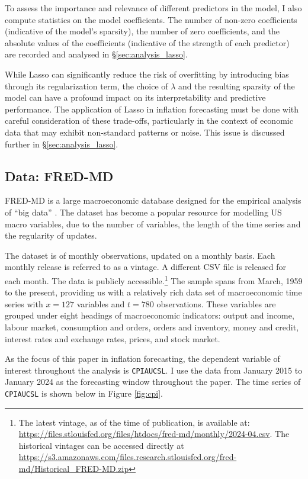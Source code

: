 To assess the importance and relevance of different predictors in the model, I also compute statistics on the model coefficients. The number of non-zero coefficients (indicative of the model's sparsity), the number of zero coefficients, and the absolute values of the coefficients (indicative of the strength of each predictor) are recorded and analysed in \S \ref{sec:analysis_lasso}.

While Lasso can significantly reduce the risk of overfitting by introducing bias through its regularization term, the choice of $\lambda$ and the resulting sparsity of the model can have a profound impact on its interpretability and predictive performance. The application of Lasso in inflation forecasting must be done with careful consideration of these trade-offs, particularly in the context of economic data that may exhibit non-standard patterns or noise. This issue is discussed further in \S \ref{sec:analysis_lasso}.



\subsection{Data: FRED-MD} \label{sec:methods_data}

FRED-MD is a large macroeconomic database designed for the empirical analysis of “big data” \autocite{McCracken2016FRED-MD:Research}. The dataset has become a popular resource for modelling US macro variables, due to the number of variables, the length of the time series and the regularity of updates.

The dataset is of monthly observations, updated on a monthly basis. Each monthly release is referred to as a vintage. A different CSV file is released for each month. The data is publicly accessible.\footnote{The latest vintage, as of the time of publication, is available at: \url{https://files.stlouisfed.org/files/htdocs/fred-md/monthly/2024-04.csv}. The historical vintages can be accessed directly at \url{https://s3.amazonaws.com/files.research.stlouisfed.org/fred-md/Historical_FRED-MD.zip}
} The sample spans from March, 1959 to the present, providing us with a relatively rich data set of macroeconomic time series with $x = 127$ variables and $t = 780$ observations. These variables are grouped under eight headings of macroeconomic indicators: output and income, labour market, consumption and orders, orders and inventory, money and credit, interest rates and exchange rates, prices, and stock market.

As the focus of this paper in inflation forecasting, the dependent variable of interest throughout the analysis is \texttt{CPIAUCSL}. I use the data from January 2015 to January 2024 as the forecasting window throughout the paper. The time series of \texttt{CPIAUCSL} is shown below in Figure \ref{fig:cpi}.


